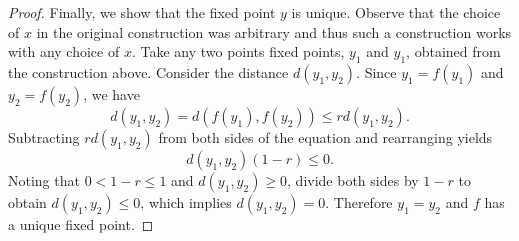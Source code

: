 \documentclass[12pt]{amsart}
\begin{document}
\begin{setup}
\begin{proof}
    Finally, we show that the fixed point $y$ is unique.
    Observe that the choice of $x$ in the original construction was arbitrary and thus such a construction works with any choice of $x$.
    Take any two points fixed points, $y_1$ and $y_1$, obtained from the construction above.
    Consider the distance $d(y_1, y_2)$.
    Since $y_1 = f(y_1)$ and $y_2 = f(y_2)$, we have 
    $$d(y_1, y_2) = d(f(y_1), f(y_2)) \leq rd(y_1,y_2).$$
    Subtracting $rd(y_1, y_2)$ from both sides of the equation and rearranging yields
    $$d(y_1, y_2)(1-r) \leq 0.$$
    Noting that $0 < 1 - r \leq 1$ and $d(y_1,y_2) \geq 0$, divide both sides by $1-r$ to obtain $d(y_1, y_2) \leq 0$, which implies $d(y_1, y_2) = 0$.
    Therefore $y_1 = y_2$ and $f$ has a unique fixed point.
  \end{proof}
\end{setup}
\end{document}
